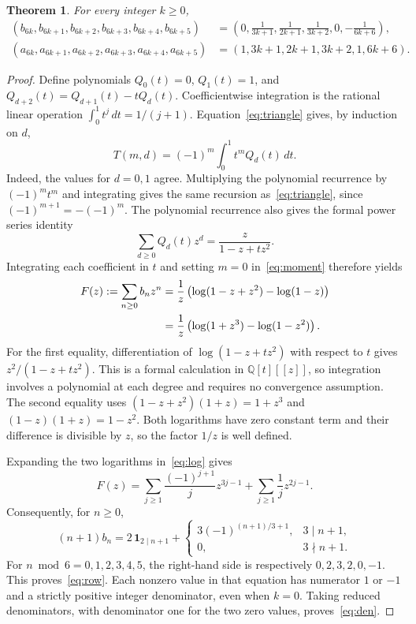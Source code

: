\documentclass[11pt]{article}
\newtheorem{theorem}{Theorem}
\begin{document}
\begin{theorem}\label{thm:main}
For every integer $k\ge0$,
\begin{align}\label{eq:row}
 (b_{6k},b_{6k+1},b_{6k+2},b_{6k+3},b_{6k+4},b_{6k+5})
 &=\left(0,\frac1{3k+1},\frac1{2k+1},\frac1{3k+2},0,-\frac1{6k+6}\right),\\
\label{eq:den}
 (a_{6k},a_{6k+1},a_{6k+2},a_{6k+3},a_{6k+4},a_{6k+5})
 &=(1,3k+1,2k+1,3k+2,1,6k+6).
\end{align}
\end{theorem}

\begin{proof}
Define polynomials $Q_0(t)=0$, $Q_1(t)=1$, and
$Q_{d+2}(t)=Q_{d+1}(t)-tQ_d(t)$. Coefficientwise integration is the rational
linear operation $\int_0^1 t^j\,dt=1/(j+1)$. Equation~\eqref{eq:triangle}
gives, by induction on $d$,
\begin{equation}\label{eq:moment}
 T(m,d)=(-1)^m\int_0^1 t^m Q_d(t)\,dt.
\end{equation}
Indeed, the values for $d=0,1$ agree. Multiplying the polynomial recurrence
by $(-1)^m t^m$ and integrating gives the same recursion
as~\eqref{eq:triangle}, since $(-1)^{m+1}=-(-1)^m$.
The polynomial recurrence also gives the formal power series identity
\[
 \sum_{d\ge0}Q_d(t)z^d=\frac{z}{1-z+tz^2}.
\]
Integrating each coefficient in $t$ and setting $m=0$ in~\eqref{eq:moment}
therefore yields
\begin{align}\label{eq:log}
 F(z):=\sum_{n\ge0}b_nz^n
 &=\frac1z\left(\log(1-z+z^2)-\log(1-z)\right)\notag\\
 &=\frac1z\left(\log(1+z^3)-\log(1-z^2)\right).
\end{align}
For the first equality, differentiation of $\log(1-z+tz^2)$ with respect
to $t$ gives $z^2/(1-z+tz^2)$. This is a formal calculation in
$\mathbb{Q}[t][[z]]$, so integration involves a polynomial at each degree
and requires no convergence assumption. The second equality uses
$(1-z+z^2)(1+z)=1+z^3$ and $(1-z)(1+z)=1-z^2$.
Both logarithms have zero constant term and their difference is divisible
by $z$, so the factor $1/z$ is well defined.

Expanding the two logarithms in~\eqref{eq:log} gives
\[
 F(z)=\sum_{j\ge1}\frac{(-1)^{j+1}}{j}z^{3j-1}
       +\sum_{j\ge1}\frac1j z^{2j-1}.
\]
Consequently, for $n\ge0$,
\begin{equation}\label{eq:coeff}
 (n+1)b_n=
 2\,\mathbf{1}_{2\mid n+1}
 +\begin{cases}3(-1)^{(n+1)/3+1},&3\mid n+1,\\0,&3\nmid n+1.\end{cases}
\end{equation}
For $n\bmod6=0,1,2,3,4,5$, the right-hand side is respectively
$0,2,3,2,0,-1$. This proves~\eqref{eq:row}. Each nonzero value in that
equation has numerator $1$ or $-1$ and a strictly positive integer
denominator, even when $k=0$. Taking reduced denominators, with denominator
one for the two zero values, proves~\eqref{eq:den}.
\end{proof}
\end{document}
